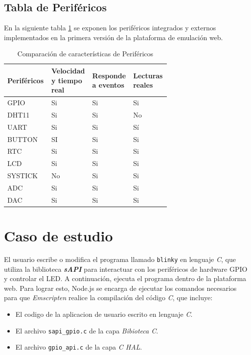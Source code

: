\subsection{Tabla de Periféricos}

En la siguiente tabla \ref{tab:perifericosCIAA} se exponen los  periféricos integrados y externos implementados en la primera versión de la plataforma de emulación web.

\begin{table}[h]
\centering
\caption[Comparación de características de Periféricos]{Comparación de características de Periféricos}
\begin{tabular}{p{0.24\linewidth} p{0.14\linewidth}  p{0.14\linewidth}  p{0.14\linewidth}}
\toprule
\textbf{Periféricos} 
& \textbf{Velocidad y tiempo real}
& \textbf{Responde a eventos}
& \textbf{Lecturas reales}
\\
\midrule
GPIO & Si & Si & Si \\
DHT11 & Si & Si & No \\
UART & Si & Si & Sí \\
BUTTON & SI & Si & Si \\
RTC & Si & Si & Si \\
LCD & Si & Si & Si \\
SYSTICK & No & Si & Si \\
ADC & Si & Si & Si \\
DAC & Si & Si & Si \\
\bottomrule
\hline
\end{tabular}
\label{tab:perifericosCIAA}
\end{table}


\section{Caso de estudio}
\label{sec:caso_de_estudio}

El usuario escribe o modifica el programa llamado \texttt{blinky} en lenguaje \textit{C}, que utiliza la biblioteca \textit{\textbf{sAPI}} para interactuar con los periféricos de hardware GPIO y controlar el LED. A continuación, ejecuta el programa dentro de la plataforma web. Para lograr esto, Node.js se encarga de ejecutar los comandos necesarios para que \textit{Emscripten} realice la compilación del código \textit{C}, que incluye: 

\begin{itemize}
	\item El codigo de la aplicacion de usuario escrito en lenguaje \textit{C}.
	\item El archivo \texttt{sapi\_gpio.c} de la capa \textit{Bibioteca C}.
	\item El archivo \texttt{gpio\_api.c} de la capa \textit{C HAL}.
\end{itemize} 


